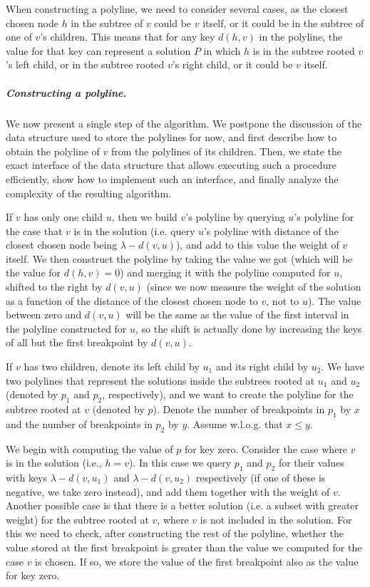 \documentclass[a4paper,UKenglish]{lipics-v2016}
\theoremstyle{plain}
\renewcommand{\paragraph}{\subparagraph}
\begin{document}
When constructing a polyline, we need to consider several cases, as the closest chosen node $h$ in the subtree of $v$ could be $v$ itself, or it could be in the subtree of one of $v$'s children. This means that for any key $d(h,v)$ in the polyline, the value for that key can represent a solution $P$ in which $h$ is in the subtree rooted $v$'s left child, or in the subtree rooted $v$'s right child, or it could be $v$ itself.


\paragraph{Constructing a polyline.} We now present a single step of the algorithm. We postpone the discussion of the data structure used to store the polylines for now, and first describe how to obtain the polyline of $v$ from the polylines of its children. Then, we state the exact interface of the data structure that allows executing such a procedure efficiently, show how to implement such an interface, and finally analyze the complexity of the resulting algorithm.

If $v$ has only one child $u$, then we build $v$'s polyline by querying $u$'s polyline for the case that $v$ is in the solution (i.e. query $u$'s polyline with distance of the closest chosen node being $\lambda-d(v,u)$), and add to this value the weight of $v$ itself. We then construct the polyline by taking the value we got (which will be the value for $d(h,v)=0$) and merging it with the polyline computed for $u$, shifted to the right by $d(v,u)$ (since we now measure the weight of the solution as a function of the distance of the closest chosen node to $v$, not to $u$). The value between zero and $d(v,u)$ will be the same as the value of the first interval in the polyline constructed for $u$, so the shift is actually done by increasing the keys of all but the first breakpoint by $d(v,u)$.

If $v$ has two children, denote its left child by $u_1$ and its right child by $u_2$. We have two polylines that represent the solutions inside the subtrees rooted at $u_1$ and $u_2$ (denoted by $p_1$ and $p_2$, respectively), and we want to create the polyline for the subtree rooted at $v$ (denoted by $p$). Denote the number of breakpoints in $p_1$ by $x$ and the number of breakpoints in $p_2$ by $y$. Assume w.l.o.g. that $x \leq y$.

We begin with computing the value of $p$ for key zero. Consider the case where $v$ is in the solution (i.e., $h=v$). In this case we query $p_1$ and $p_2$ for their values with keys $\lambda - d(v,u_1)$ and $\lambda - d(v,u_2)$ respectively (if one of these is negative, we take zero instead), and add them together with the weight of $v$. Another possible case is that there is a better solution (i.e. a subset with greater weight) for the subtree rooted at $v$, where $v$ is not included in the solution. For this we need to check, after constructing the rest of the polyline, whether the value stored at the first breakpoint is greater than the value we computed for the case $v$ is chosen. If so, we store the value of the first breakpoint also as the value for key zero.
\end{document}
